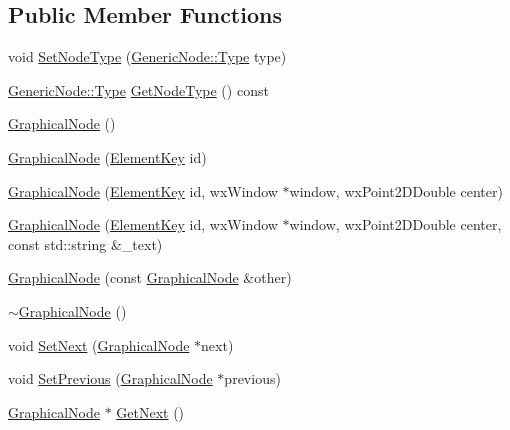 \subsection*{Public Member Functions}
\begin{DoxyCompactItemize}
\item 
void \hyperlink{class_graphical_node_a2be01228b0d5b17f1d14038aeee25619}{Set\+Node\+Type} (\hyperlink{class_generic_node_a9e7985ab9bbfa1c85091adc0ab71a6b6}{Generic\+Node\+::\+Type} type)
\item 
\hyperlink{class_generic_node_a9e7985ab9bbfa1c85091adc0ab71a6b6}{Generic\+Node\+::\+Type} \hyperlink{class_graphical_node_a4c5493ddcfca4d433421ae06eac1b19a}{Get\+Node\+Type} () const
\item 
\hyperlink{class_graphical_node_a9c34baa875b133f8c5b1da78da189f1d}{Graphical\+Node} ()
\item 
\hyperlink{class_graphical_node_a831cbab85b4aa47c9e5e45f13f840671}{Graphical\+Node} (\hyperlink{_graphical_element_8h_ade5fd6c85839a416577ff9de1605141e}{Element\+Key} id)
\item 
\hyperlink{class_graphical_node_a8b6df5a7f16ea432b12b54c13d893e36}{Graphical\+Node} (\hyperlink{_graphical_element_8h_ade5fd6c85839a416577ff9de1605141e}{Element\+Key} id, wx\+Window $\ast$window, wx\+Point2\+D\+Double center)
\item 
\hyperlink{class_graphical_node_a738f88bed48b5089d795f8778f984cc6}{Graphical\+Node} (\hyperlink{_graphical_element_8h_ade5fd6c85839a416577ff9de1605141e}{Element\+Key} id, wx\+Window $\ast$window, wx\+Point2\+D\+Double center, const std\+::string \&\+\_\+text)
\item 
\hyperlink{class_graphical_node_a63c2c7ac34c3f9b3a1383dd157cf731c}{Graphical\+Node} (const \hyperlink{class_graphical_node}{Graphical\+Node} \&other)
\item 
\hyperlink{class_graphical_node_a044a09111bb337580f2a40fcff42ef6f}{$\sim$\+Graphical\+Node} ()
\item 
void \hyperlink{class_graphical_node_a036c1cc48701511037e50bc74fd8d430}{Set\+Next} (\hyperlink{class_graphical_node}{Graphical\+Node} $\ast$next)
\item 
void \hyperlink{class_graphical_node_ad165a0c444192d4c7ff6a07c62972dab}{Set\+Previous} (\hyperlink{class_graphical_node}{Graphical\+Node} $\ast$previous)
\item 
\hyperlink{class_graphical_node}{Graphical\+Node} $\ast$ \hyperlink{class_graphical_node_a77ea0722141f7915424a8db83b72f8c8}{Get\+Next} ()
\item 

\end{DoxyCompactItemize}
